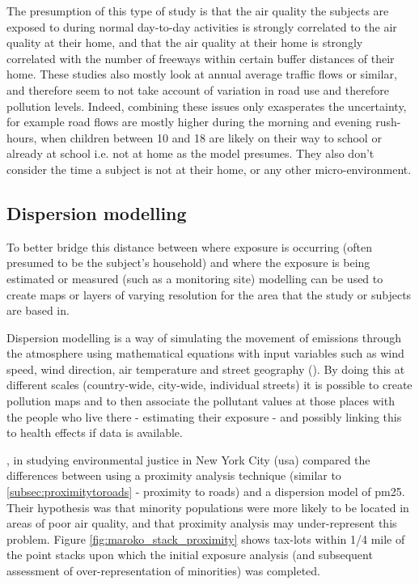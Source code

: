 The presumption of this type of study is that the air quality the subjects are exposed to during normal day-to-day activities is strongly correlated to the air quality at their home, and that the air quality at their home is strongly correlated with the number of freeways within certain buffer distances of their home. These studies also mostly look at annual average traffic flows or similar, and therefore seem to not take account of variation in road use and therefore pollution levels. Indeed, combining these issues only exasperates the uncertainty, for example road flows are mostly higher during the morning and evening rush-hours, when children between 10 and 18 are likely on their way to school or already at school i.e. not at home as the model presumes. They also don't consider the time a subject is not at their home, or any other micro-environment. 


\subsection{Dispersion modelling}
\label{subsec:dispersionmodelling}

To better bridge this distance between where exposure is occurring (often presumed to be the subject's household) and where the exposure is being estimated or measured (such as a monitoring site) modelling can be used to create maps or layers of varying resolution for the area that the study or subjects are based in.

Dispersion modelling is a way of simulating the movement of emissions through the atmosphere using mathematical equations with input variables such as wind speed, wind direction, air temperature and street geography (\cite{EnvironmentalProtectionAgency2008}). By doing this at different scales (country-wide, city-wide, individual streets) it is possible to create pollution maps and to then associate the pollutant values at those places with the people who live there - estimating their exposure - and possibly linking this to health effects if data is available.


\cite{Maroko2012}, in studying environmental justice in New York City (\gls{usa}) compared the differences between using a proximity analysis technique (similar to \ref{subsec:proximitytoroads} - proximity to roads) and a dispersion model of \gls{pm25}. Their hypothesis was that minority populations were more likely to be located in areas of poor air quality, and that proximity analysis may under-represent this problem. Figure \ref{fig:maroko_stack_proximity} shows tax-lots within 1\slash4 mile of the point stacks upon which the initial exposure analysis (and subsequent assessment of over-representation of minorities) was completed. 

